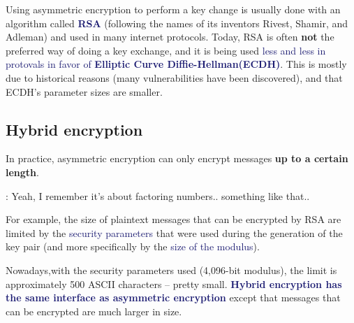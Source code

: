 \documentclass[dvipsnames]{article}
\newcommand{\mycola}{MidnightBlue}
\newcommand{\cola}[1]{\textcolor{\mycola}{#1}}
\newcommand{\Cola}[1]{\textcolor{\mycola}{\textbf{#1}}}
\newcommand\uptodown[3][-o]{\draw[very thick,#1](#2.south) to [out=270,in=90] (#3.north);}
\newcommand\lefttoright[3][-latex]{\draw[very thick,#1](#2.east) to[out=0,in=180] (#3.west);}
\begin{document}
\begin{center}
\end{center}
Using asymmetric encryption to perform a key change is usually done with an
algorithm called \Cola{RSA} (following the names of its inventors Rivest,
Shamir, and Adleman) and used in many internet protocols. Today, RSA is often
\textbf{not} the preferred way of doing a key exchange, and it is being used
\cola{less and less in protovals in favor of \textbf{Elliptic Curve
    Diffie-Hellman(ECDH)}}. This is mostly due to historical reasons (many
vulnerabilities have been discovered), and that ECDH's parameter sizes are smaller.

\subsection{Hybrid encryption}

In practice, asymmetric encryption can only encrypt messages \textbf{up to a certain
  length}.
\begin{tcolorbox}
   : Yeah, I remember it's about factoring numbers.. something
  like that..  
\end{tcolorbox}
For example, the size of plaintext messages that can be encrypted by RSA are
limited by the \cola{security parameters} that were used during the generation
of the key pair (and more specifically by the \cola{size of the modulus}). 

Nowadays,with the security parameters used (4,096-bit modulus), the limit is
approximately 500 ASCII characters -- pretty small.
\Cola{Hybrid encryption has the same interface as asymmetric encryption} except
that messages that can be encrypted are much larger in size. 
\end{document}
